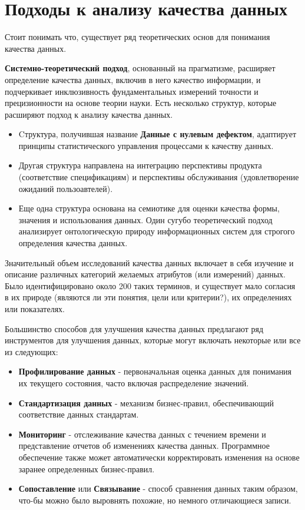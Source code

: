 \documentclass{article}
\begin{document}
\newpage

\section{Подходы к анализу качества данных}

Стоит понимать что, существует ряд теоретических основ для понимания качества данных.

\textbf{Системно-теоретический подход}, основанный на прагматизме, расширяет определение качества данных, включив в него качество информации, и подчеркивает инклюзивность фундаментальных измерений точности и прецизионности на основе теории науки.
Есть несколько структур, которые расширяют подход к анализу качества данных.
\begin{itemize}
    \item Cтруктура, получившая название \textbf{Данные с нулевым дефектом}, адаптирует принципы статистического управления процессами к качеству данных.
    \item Другая структура направлена на интеграцию перспективы продукта (соответствие спецификациям) и перспективы обслуживания (удовлетворение ожиданий пользоавтелей).
    \item  Еще одна структура основана на семиотике для оценки качества формы, значения и использования данных. Один сугубо теоретический подход анализирует онтологическую природу информационных систем для строгого определения качества данных.
\end{itemize}

Значительный объем исследований качества данных включает в себя изучение и
описание различных категорий желаемых атрибутов (или измерений) данных. Было
идентифицировано около 200 таких терминов, и существует мало согласия в их природе (являются ли эти понятия, цели или критерии?), их определениях или показателях.

Большинство способов для улучшения качества данных предлагают ряд инструментов для улучшения данных, которые могут включать некоторые или все из следующих:

\begin{itemize}
    \item \textbf{Профилирование данных} - первоначальная оценка данных для понимания их текущего состояния, часто включая распределение значений.
    \item \textbf{Стандартизация данных} - механизм бизнес-правил, обеспечивающий соответствие данных стандартам.
    \item \textbf{Мониторинг} - отслеживание качества данных с течением времени и представление отчетов об изменениях качества данных. Программное обеспечение также может автоматически корректировать изменения на основе заранее определенных бизнес-правил.
    \item \textbf{Сопоставление} или \textbf{Связывание} - способ сравнения данных таким образом, что-бы можно было выровнять похожие, но немного отличающиеся записи.
\end{itemize}
\end{document}
